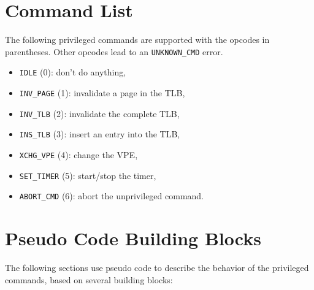 \section{Command List}

The following privileged commands are supported with the opcodes in parentheses. Other opcodes lead
to an \texttt{UNKNOWN\_CMD} error.

\begin{itemize}
  \item \texttt{IDLE} (0):  don't do anything, \extend{}
  \item \texttt{INV\_PAGE} (1): invalidate a page in the TLB, 
  \item \texttt{INV\_TLB} (2): invalidate the complete TLB,
  \item \texttt{INS\_TLB} (3): insert an entry into the TLB, \extend{}
  \item \texttt{XCHG\_VPE} (4): change the VPE, 
  \item \texttt{SET\_TIMER} (5): start/stop the timer,
  \item \texttt{ABORT\_CMD} (6): abort the unprivileged command. \extend{}
\end{itemize}

\section{Pseudo Code Building Blocks}

The following sections use pseudo code to describe the behavior of the privileged commands, based on
several building blocks:

